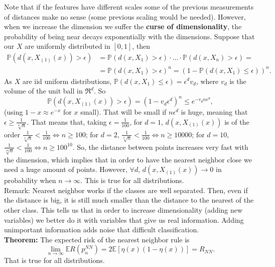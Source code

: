\documentclass[11pt, english]{article}
\begin{document}
Note that if the features have different scales some of the previous measurements of distances make no sense (some previous scaling would be needed). However, when we increase the dimension we suffer the \textbf{curse of dimensionality}, the probability of being near decays exponentially with the dimensions. Suppose that our $X$ are uniformly distributed in $[0,1]$, then
\begin{align}
	\mathbb{P}(d(x,X_{(1)}(x))>\epsilon)&=\mathbb{P}(d(x,X_1)>\epsilon)\cdot\dots\cdot \mathbb{P}(d(x,X_n)>\epsilon)=\\ &=\mathbb{P}(d(x,X_1)>\epsilon)^n=(1-\mathbb{P}(d(x,X_1)\leq \epsilon))^n.
\end{align}
As $X$ are iid uniform distributions, $\mathbb{P}(d(x,X_1)\leq \epsilon)=\epsilon^dv_d$, where $v_d$ is the volume of the unit ball in $\Re^d$. So
\begin{equation}
	\mathbb{P}(d(x,X_{(1)}(x))>\epsilon)=(1-v_d\epsilon^d)^n\leq e^{-v_dn\epsilon^d},
\end{equation}
(using $1-x\approx e^{-x}$ for $x$ small). That will be small if $n\epsilon^d$ is huge, meaning that $\epsilon\geq \frac{1}{\sqrt[d]{n}}$. That means that, taking $\epsilon=\frac{1}{100}$, for $d=1$, $d(x,X_{(1)}(x))$ is of the order $\frac{1}{\sqrt[1]{n}}<\frac{1}{100}\Leftrightarrow n\geq 100$; for $d=2$, $\frac{1}{\sqrt[2]{n}}<\frac{1}{100}\Leftrightarrow n\geq 10000$; for $d=10$, $\frac{1}{\sqrt[10]{n}}<\frac{1}{100}\Leftrightarrow n\geq 100^{10}$. So, the distance between points increases very fast with the dimension, which implies that in order to have the nearest neighbor close we need a huge amount of points. However, $\forall d$, $d(x,X_{(1)}(x))\rightarrow 0$ in probability when $n\rightarrow\infty$. This is true for all distributions.\\

Remark: Nearest neighbor works if the classes are well separated. Then, even if the distance is big, it is still much smaller than the distance to the nearest of the other class. This tells us that in order to increase dimensionality (adding new variables) we better do it with variables that give us real information. Adding unimportant information adds noise that difficult classification.\\

\textbf{Theorem:} The expected risk of the nearest neighbor rule is 
\begin{equation}
	\underset{n\rightarrow \infty}{\lim}\mathbb{E}R(p_n^{NN})=2\mathbb{E}[\eta(x)(1-\eta(x))]=R_{NN}.
\end{equation}
That is true for all distributions.\\
\end{document}
